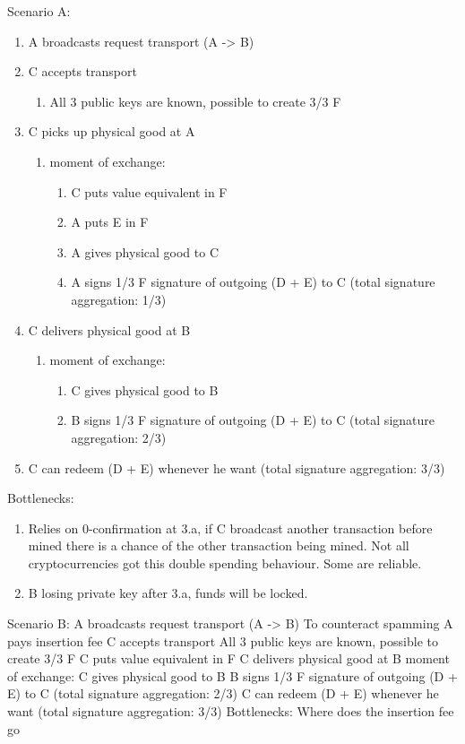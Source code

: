 \documentclass[Nomencl]{SelimArticle}
\begin{document}
Scenario A:
\begin{enumerate}
  \item A broadcasts request transport (A -> B)
  \item C accepts transport
  \begin{enumerate}
    \item All 3 public keys are known, possible to create 3/3 F
  \end{enumerate}
  \item C picks up physical good at A
  \begin{enumerate}
    \item moment of exchange:
    \begin{enumerate}
      \item C puts value equivalent in F
      \item A puts E in F
      \item A gives physical good to C
      \item A signs 1/3 F signature of outgoing (D + E) to C (total signature aggregation: 1/3)
    \end{enumerate}
  \end{enumerate}
  \item C delivers physical good at B
  \begin{enumerate}
    \item moment of exchange:
    \begin{enumerate}
      \item C gives physical good to B
      \item B signs 1/3 F signature of outgoing (D + E) to C (total signature aggregation: 2/3)
    \end{enumerate}
  \end{enumerate}
  \item C can redeem (D + E) whenever he want (total signature aggregation: 3/3)
\end{enumerate}

Bottlenecks:
\begin{enumerate}
  \item Relies on 0-confirmation at 3.a, if C broadcast another transaction before mined there is a chance of the other transaction being mined. Not all cryptocurrencies got this double spending behaviour. Some are reliable.
  \item B losing private key after 3.a, funds will be locked.
\end{enumerate}

Scenario B:
A broadcasts request transport (A -> B)
To counteract spamming
A pays insertion fee
C accepts transport
All 3 public keys are known, possible to create 3/3 F
C puts value equivalent in F
C delivers physical good at B
moment of exchange:
C gives physical good to B
B signs 1/3 F signature of outgoing (D + E) to C (total signature aggregation: 2/3)
C can redeem (D + E) whenever he want (total signature aggregation: 3/3)
Bottlenecks:
Where does the insertion fee go
\end{document}
